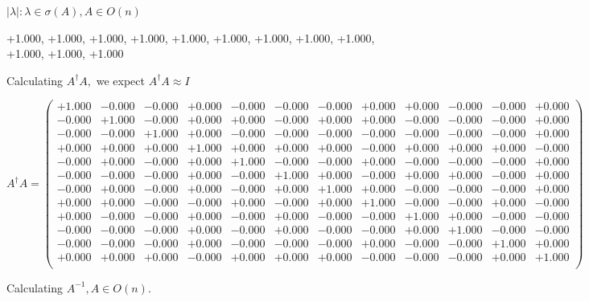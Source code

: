 \documentclass[9pt]{article}
\theoremstyle{plain}
\theoremstyle{definition}
\theoremstyle{remark}
\numberwithin{equation}{section}
\begin{document}
 $|\lambda | : \lambda \in \sigma(A) , A \in O(n)$

+1.000, +1.000, +1.000, +1.000, +1.000, +1.000, +1.000, +1.000, +1.000, +1.000, +1.000, +1.000


Calculating $A^{\dag} A,$  we expect $A^{\dag} A \approx I$

$A^{\dag} A = \left(
\begin{array}{
cccccccccccc}
+1.000 & -0.000 & -0.000 & +0.000 & -0.000 & -0.000 & -0.000 & +0.000 & +0.000 & -0.000 & -0.000 & +0.000 \\
-0.000 & +1.000 & -0.000 & +0.000 & +0.000 & -0.000 & +0.000 & +0.000 & -0.000 & -0.000 & -0.000 & +0.000 \\
-0.000 & -0.000 & +1.000 & +0.000 & -0.000 & -0.000 & -0.000 & -0.000 & -0.000 & -0.000 & -0.000 & +0.000 \\
+0.000 & +0.000 & +0.000 & +1.000 & +0.000 & +0.000 & +0.000 & -0.000 & +0.000 & +0.000 & +0.000 & -0.000 \\
-0.000 & +0.000 & -0.000 & +0.000 & +1.000 & -0.000 & -0.000 & +0.000 & -0.000 & -0.000 & -0.000 & +0.000 \\
-0.000 & -0.000 & -0.000 & +0.000 & -0.000 & +1.000 & +0.000 & -0.000 & +0.000 & +0.000 & -0.000 & +0.000 \\
-0.000 & +0.000 & -0.000 & +0.000 & -0.000 & +0.000 & +1.000 & +0.000 & -0.000 & -0.000 & -0.000 & +0.000 \\
+0.000 & +0.000 & -0.000 & -0.000 & +0.000 & -0.000 & +0.000 & +1.000 & -0.000 & -0.000 & +0.000 & -0.000 \\
+0.000 & -0.000 & -0.000 & +0.000 & -0.000 & +0.000 & -0.000 & -0.000 & +1.000 & +0.000 & -0.000 & -0.000 \\
-0.000 & -0.000 & -0.000 & +0.000 & -0.000 & +0.000 & -0.000 & -0.000 & +0.000 & +1.000 & -0.000 & -0.000 \\
-0.000 & -0.000 & -0.000 & +0.000 & -0.000 & -0.000 & -0.000 & +0.000 & -0.000 & -0.000 & +1.000 & +0.000 \\
+0.000 & +0.000 & +0.000 & -0.000 & +0.000 & +0.000 & +0.000 & -0.000 & -0.000 & -0.000 & +0.000 & +1.000 \\
\end{array}
\right)$ \newline 

Calculating $A^{-1} ,  A \in O(n)$.
\end{document}
